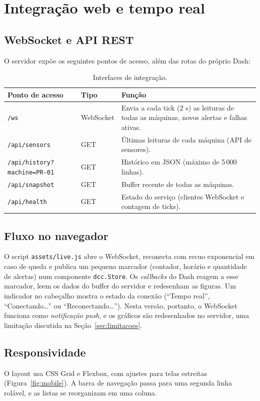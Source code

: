 \documentclass[12pt,a4paper]{article}
\newcommand{\codigo}[1]{\texttt{\small #1}}
\begin{document}
\section{Integração web e tempo real}
\label{sec:integracao}
\subsection{WebSocket e API REST}
O servidor expõe os seguintes pontos de acesso, além das rotas do próprio Dash:

\begin{table}[H]
\centering
\caption{Interfaces de integração.}
\label{tab:api}
\begin{tabularx}{\textwidth}{@{}l l X@{}}
\toprule
\textbf{Ponto de acesso} & \textbf{Tipo} & \textbf{Função}\\
\midrule
\codigo{/ws} & WebSocket & Envia a cada tick (2 s) as leituras de todas as máquinas, novos alertas e falhas ativas.\\
\codigo{/api/sensors} & GET & Últimas leituras de cada máquina (API de sensores).\\
\codigo{/api/history?machine=PR-01} & GET & Histórico em JSON (máximo de 5\,000 linhas).\\
\codigo{/api/snapshot} & GET & Buffer recente de todas as máquinas.\\
\codigo{/api/health} & GET & Estado do serviço (clientes WebSocket e contagem de ticks).\\
\bottomrule
\end{tabularx}
\end{table}

\subsection{Fluxo no navegador}
O script \codigo{assets/live.js} abre o WebSocket, reconecta com recuo exponencial em caso de queda e publica um pequeno marcador (contador, horário e
quantidade de alertas) num componente \codigo{dcc.Store}. Os \emph{callbacks} do Dash reagem a esse marcador, leem os dados do buffer do servidor e redesenham as
figuras. Um indicador no cabeçalho mostra o estado da conexão (``Tempo real'', ``Conectando\ldots'' ou ``Reconectando\ldots''). Nesta versão, portanto, o
WebSocket funciona como \emph{notificação push}, e os gráficos são redesenhados no servidor, uma limitação discutida na Seção~\ref{sec:limitacoes}.

\subsection{Responsividade}
O layout usa CSS Grid e Flexbox, com ajustes para telas estreitas (Figura~\ref{fig:mobile}). A barra de navegação passa para uma segunda linha rolável, e as listas se reorganizam
em uma coluna.
\end{document}
